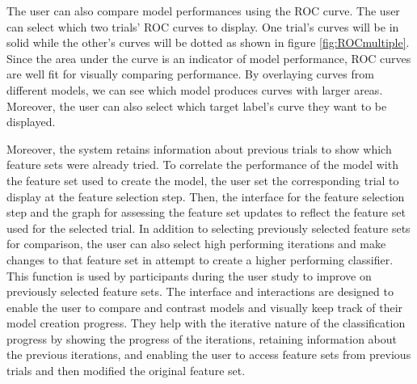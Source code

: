 The user can also compare model performances using the ROC curve. The user can select which two trials' ROC curves to display. One trial's curves will be in solid while the other's curves will be dotted as shown in figure \ref{fig:ROCmultiple}. Since the area under the curve is an indicator of model performance, ROC curves are well fit for visually comparing performance. By overlaying curves from different models, we can see which model produces curves with larger areas. Moreover, the user can also select which target label's curve they want to be displayed.  

Moreover, the system retains information about previous trials to show which feature sets were already tried. To correlate the performance of the model with the feature set used to create the model, the user set the corresponding trial to display at the feature selection step. Then, the interface for the feature selection step and the graph for assessing the feature set updates to reflect the feature set used for the selected trial. In addition to selecting previously selected feature sets for comparison, the user can also select high performing iterations and make changes to that feature set in attempt to create a higher performing classifier. This function is used by participants during the user study to improve on previously selected feature sets. The interface and interactions are designed to enable the user to compare and contrast models and visually keep track of their model creation progress. They help with the iterative nature of the classification progress by showing the progress of the iterations, retaining information about the previous iterations, and enabling the user to access feature sets from previous trials and then modified the original feature set. 


